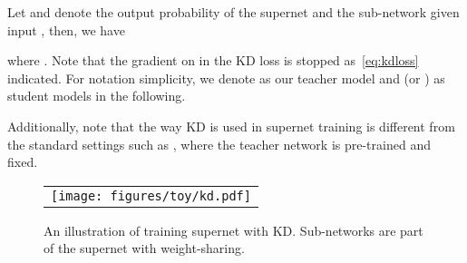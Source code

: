 \documentclass{article}
\newcommand{\qq}[1]{{\small\red{[QL:~#1]}}}
\begin{document}
Let  and  denote the output probability of the supernet and the sub-network  given input , then, we have

where . Note that the gradient on  in the KD loss is stopped as~\eqref{eq:kdloss} indicated. For notation simplicity, 
we denote  as our teacher model and  (or ) as student models in the following. 

Additionally, note that the way KD is used in supernet training is different from the standard settings such as \citet[e.g.,][]{hinton2015distilling}, where the teacher network is pre-trained and fixed.



\iffalse
Given the weight-sharing parameter  and the architecture space , we denote  as the parameter for a sub-network  and define  and  as the largest and smallest sub-network in . Mark the training set as ,
the training objective is

\qq{does the algorithm actually optimize a single object, or it is actually an iterative algorithm that does not optimize any object? Otherwise there will be stop gradient issues on the KD loss.}
\qq{ is strange. Write  where  is a fixed sampling distribution on ?}
where  is a coefficient,  is a uniform sampler for all candidate  in ,  is the output of sub-network ,  denotes supervised loss while  denotes the knowledge distillation loss.
Here,  is trained with  and under the supervision of the label  from .
The other architectures  (including ) is trained with , the soft label provided by the biggest sub-network . 
Overall, the objective contains two parts.
The first part is the expectation of the KD loss over all the architecture . The second term is called as sandwich rule, which introduces the supervised loss for the biggest and KD loss for smallest sub-network.
In practice, equation \eqref{eq:loss} is optimized under a stochastic version with gradient descent, where random samples of  and  is drawn for each gradient descent step.
\fi




\begin{figure}[t]
\centering
\begin{tabular}{c}
\texttt{[image: figures/toy/kd.pdf]} \\
\end{tabular}
\caption{An illustration of training supernet with KD. Sub-networks are part of the supernet with weight-sharing. }
\label{fig:supernet_kd}
\end{figure}
 
\end{document}
